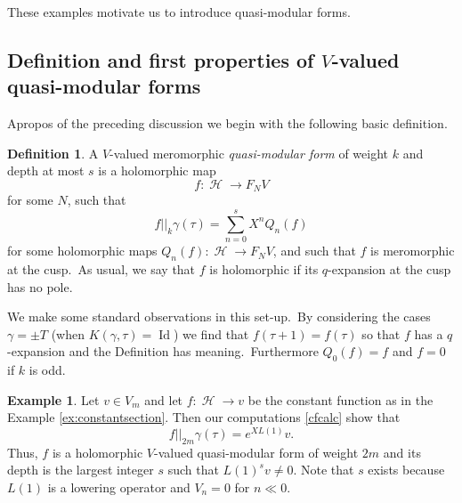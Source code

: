 \documentclass[12pt]{amsart}
\theoremstyle{plain}
\theoremstyle{definition}
\newtheorem{dfn}[thm]{Definition}
\newtheorem{ex}[thm]{Example}
\theoremstyle{remark}
\DeclareMathOperator{\uhp}{\mathcal{H}}
\DeclareMathOperator{\Id}{Id}
\begin{document}
These examples motivate us to introduce quasi-modular forms.
 
\subsection{Definition and first properties of \texorpdfstring{$V$}{V}-valued quasi-modular forms}
\label{ss:qmfdefinition}

Apropos of the preceding discussion we begin with the following basic definition.
\begin{dfn}
\label{d:QMV}
 A $V$-valued meromorphic \emph{quasi-modular form} of weight $k$ and depth at most $s$ is a holomorphic map
 \[
 f\colon \uhp \to F_NV
 \]
 for some $N$, such that 
 \[
   f||_k\gamma(\tau)=\sum_{n=0}^s X^nQ_n(f)
 \]
 for some holomorphic maps $Q_n(f) \colon \uhp \to F_NV$, and such that $f$ is meromorphic at the cusp.\ As usual, we say that $f$ is holomorphic if its $q$-expansion at the cusp has no pole.
\end{dfn}

We make some standard observations in this set-up.\ By considering the cases $\gamma=\pm T$ (when $K(\gamma, \tau)=\Id$) we find that $f(\tau+1)=f(\tau)$ so that $f$ has a $q$-expansion and the Definition has meaning.\ Furthermore $Q_0(f)=f$ and
$f=0$ if $k$ is odd.

\begin{ex}
    Let $v \in V_m$ and let $f:\uhp\rightarrow v$ be the constant function as in the Example \ref{ex:constantsection}. Then our computations  \eqref{cfcalc} show that 
    $$f||_{2m}\gamma(\tau)
    =e^{XL(1)}v.$$ 
    Thus, $f$ is a holomorphic $V$-valued quasi-modular form of weight $2m$ and its depth is the largest integer $s$ such that $L(1)^sv\neq0$. Note that $s$ exists because $L(1)$ is a lowering operator and $V_n=0$ for $n\ll0$.
\end{ex}
\end{document}
